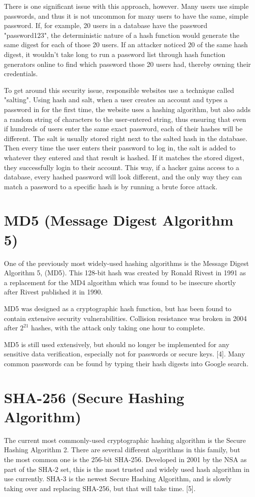 \documentclass{article}
\begin{document}
There is one significant issue with this approach, however. Many users use simple passwords, and thus it is not uncommon for many users to have the same, simple password. If, for example, 20 users in a database have the password "password123", the deterministic nature of a hash function would generate the same digest for each of those 20 users. If an attacker noticed 20 of the same hash digest, it wouldn't take long to run a password list through hash function generators online to find which password those 20 users had, thereby owning their credentials. 

To get around this security issue, responsible websites use a technique called "salting". Using hash and salt, when a user creates an account and types a password in for the first time, the website uses a hashing algorithm, but also adds a random string of characters to the user-entered string, thus ensuring that even if hundreds of users enter the same exact password, each of their hashes will be different. The salt is usually stored right next to the salted hash in the database. Then every time the user enters their password to log in, the salt is added to whatever they entered and that result is hashed. If it matches the stored digest, they successfully login to their account. 
This way, if a hacker gains access to a database, every hashed password will look different, and the only way they can match a password to a specific hash is by running a brute force attack. 


\section{MD5 (Message Digest Algorithm 5)}
\tab One of the previously most widely-used hashing algorithms is the Message Digest Algorithm 5, (MD5). This 128-bit hash was created by Ronald Rivest in 1991 as a replacement for the MD4 algorithm which was found to be insecure shortly after Rivest published it in 1990. 

MD5 was designed as a cryptographic hash function, but has been found to contain extensive security vulnerabilities. Collision resistance was broken in 2004 after $2^{21}$ hashes, with the attack only taking one hour to complete. 

MD5 is still used extensively, but should no longer be implemented for any sensitive data verification, especially not for passwords or secure keys. [4]. Many common passwords can be found by typing their hash digests into Google search.


\section{SHA-256 (Secure Hashing Algorithm)}
\tab The current most commonly-used cryptographic hashing algorithm is the Secure Hashing Algorithm 2. There are several different algorithms in this family, but the most common one is the 256-bit SHA-256. Developed in 2001 by the NSA as part of the SHA-2 set, this is the most trusted and widely used hash algorithm in use currently. SHA-3 is the newest Secure Hashing Algorithm, and is slowly taking over and replacing SHA-256, but that will take time. [5].
\end{document}
